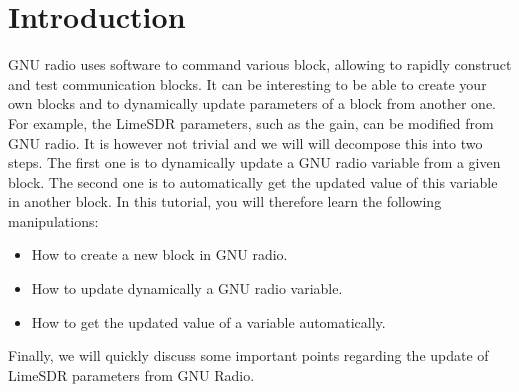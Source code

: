 \section*{Introduction}

GNU radio uses software to command various block, allowing to rapidly construct and test communication blocks. It can be interesting to be able to create your own blocks and to dynamically update parameters of a block from another one. For example, the LimeSDR parameters, such as the gain, can be modified from GNU radio. It is however not trivial and we will will decompose this into two steps. The first one is to dynamically update a GNU radio variable from a given block. The second one is to automatically get the updated value of this variable in another block. In this tutorial, you will therefore learn the following manipulations: 

\begin{itemize}
    \item How to create a new block in GNU radio.
    \item How to update dynamically a GNU radio variable.
    \item How to get the updated value of a variable automatically.
\end{itemize}

Finally, we will quickly discuss some important points regarding the update of LimeSDR parameters from GNU Radio.



